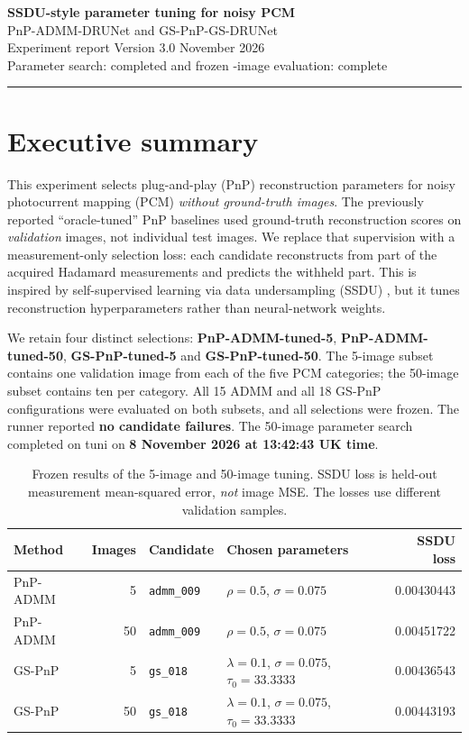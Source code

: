 \documentclass[a4paper,10pt]{article}
\begin{document}
\vspace*{0.25em}
{\LARGE\bfseries\color{main} SSDU-style parameter tuning for noisy PCM}\\[4pt]
{\large PnP-ADMM-DRUNet and GS-PnP-GS-DRUNet}\\[6pt]
{\color{muted} Experiment report \quad Version 3.0  November 2026}\\[2pt]
{\color{muted} Parameter search: completed and frozen -image evaluation: complete}
\vspace{0.2cm}\hrule

\section{Executive summary}

This experiment selects plug-and-play (PnP) reconstruction parameters for noisy photocurrent mapping (PCM) \emph{without ground-truth images}. The previously reported ``oracle-tuned'' PnP baselines used ground-truth reconstruction scores on \emph{validation} images, not individual test images. We replace that supervision with a measurement-only selection loss: each candidate reconstructs from part of the acquired Hadamard measurements and predicts the withheld part. This is inspired by self-supervised learning via data undersampling (SSDU) \cite{yaman2020}, but it tunes reconstruction hyperparameters rather than neural-network weights.

We retain four distinct selections: \textbf{PnP-ADMM-tuned-5}, \textbf{PnP-ADMM-tuned-50}, \textbf{GS-PnP-tuned-5} and \textbf{GS-PnP-tuned-50}. The 5-image subset contains one validation image from each of the five PCM categories; the 50-image subset contains ten per category. All 15 ADMM and all 18 GS-PnP configurations were evaluated on both subsets, and all selections were frozen. The runner reported \textbf{no candidate failures}. The 50-image parameter search completed on tuni on \textbf{8 November 2026 at 13:42:43 UK time}.

\begin{table}[H]
\centering\small
\begin{tabularx}{\linewidth}{@{}lrlXr@{}}
\toprule
\textbf{Method} & \textbf{Images} & \textbf{Candidate} & \textbf{Chosen parameters} & \textbf{SSDU loss} \\
\midrule
PnP-ADMM & 5 & \texttt{admm\_009} & $\rho=0.5$, $\sigma=0.075$ & 0.00430443 \\
PnP-ADMM & 50 & \texttt{admm\_009} & $\rho=0.5$, $\sigma=0.075$ & 0.00451722 \\
GS-PnP & 5 & \texttt{gs\_018} & $\lambda=0.1$, $\sigma=0.075$, $\tau_0=33.3333$ & 0.00436543 \\
GS-PnP & 50 & \texttt{gs\_018} & $\lambda=0.1$, $\sigma=0.075$, $\tau_0=33.3333$ & 0.00443193 \\
\bottomrule
\end{tabularx}
\caption{Frozen results of the 5-image and 50-image tuning. SSDU loss is held-out measurement mean-squared error, \emph{not} image MSE. The losses use different validation samples.}
\label{tab:winners}
\end{table}
\end{document}
